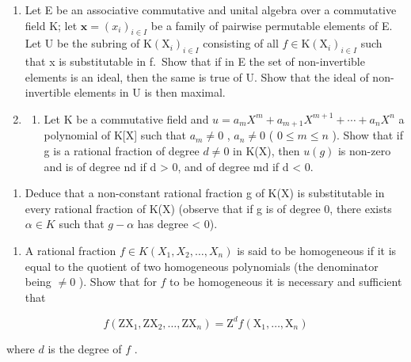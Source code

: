\begin{enumerate}
\def\labelenumi{\arabic{enumi})}
\item
  Let E be an associative commutative and unital algebra over a commutative field K; let \(\mathbf{x} = (x_i)_{i \in I}\) be a family of pairwise permutable elements of E. Let U be the subring of \(\mathrm{K}(\mathrm{X}_i)_{i \in I}\) consisting of all \(f \in \mathrm{K}(\mathrm{X}_i)_{i \in I}\) such that x is substitutable in f.~Show that if in E the set of non-invertible elements is an ideal, then the same is true of U. Show that the ideal of non-invertible elements in U is then maximal.
\item
  \begin{enumerate}
  \def\labelenumii{\alph{enumii})}
  \tightlist
  \item
    Let K be a commutative field and \(u = a_{m}X^{m} + a_{m+1}X^{m+1} + \cdots + a_{n}X^{n}\) a polynomial of K{[}X{]} such that \(a_{m} \neq 0\) , \(a_{n} \neq 0\) ( \(0 \leq m \leq n\) ). Show that if g is a rational fraction of degree \(d \neq 0\) in K(X), then \(u(g)\) is non-zero and is of degree nd if d \textgreater{} 0, and of degree md if d \textless{} 0.
  \end{enumerate}
\end{enumerate}

\begin{enumerate}
\def\labelenumi{\alph{enumi})}
\setcounter{enumi}{1}
\tightlist
\item
  Deduce that a non-constant rational fraction g of K(X) is substitutable in every rational fraction of K(X) (observe that if g is of degree 0, there exists \(\alpha \in K\) such that \(g - \alpha\) has degree \textless{} 0).
\end{enumerate}

\begin{enumerate}
\def\labelenumi{\arabic{enumi})}
\setcounter{enumi}{2}
\tightlist
\item
  A rational fraction \(f \in K(X_1, X_2, \ldots, X_n)\) is said to be homogeneous if it is equal to the quotient of two homogeneous polynomials (the denominator being \(\neq 0\) ). Show that for \(f\) to be homogeneous it is necessary and sufficient that
\end{enumerate}

\[
f \left(\mathrm{ZX} _ {1}, \mathrm{ZX} _ {2}, \dots , \mathrm{ZX} _ {n}\right) = \mathrm{Z} ^ {d} f \left(\mathrm{X} _ {1}, \dots , \mathrm{X} _ {n}\right)
\]

where \(d\) is the degree of \(f\) .

